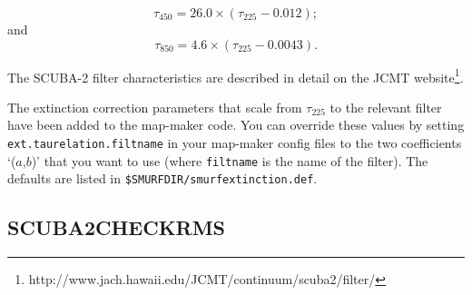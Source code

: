 \documentclass[twoside,11pt]{article}
\newcommand{\htmladdnormallinkfoot}[2]{#1\footnote{#2}}
\newcommand{\xlabel}[1]{}
\renewcommand{\_}{\texttt{\symbol{95}}}
\newcommand{\param}[1]{\texttt{#1}}
\newcommand{\file}[1]{\texttt{#1}}
\begin{document}
\begin{equation}
\tau_{450} = 26.0 \times (\tau_{225} - 0.012);
\end{equation}
and
\begin{equation}
\tau_{850} = 4.6 \times (\tau_{225} - 0.0043).
\end{equation}

The SCUBA-2 filter characteristics are described in
detail \htmladdnormallinkfoot{on the JCMT
website}{http://www.jach.hawaii.edu/JCMT/continuum/scuba2/filter/}.

The extinction correction parameters that scale from $\tau_{225}$ to
the relevant filter have been added to the map-maker code. You can
override these values by setting \param{ext.taurelation.filtname} in
your map-maker config files to the two coefficients `($a$,$b$)' that you
want to use (where \param{filtname} is the name of the filter). The
defaults are listed in \file{\$SMURF\_DIR/smurf\_extinction.def}.

\newpage
\subsection{\xlabel{calcrms}SCUBA2\_CHECK\_RMS}
\label{app:checkrmsparams}
\end{document}
